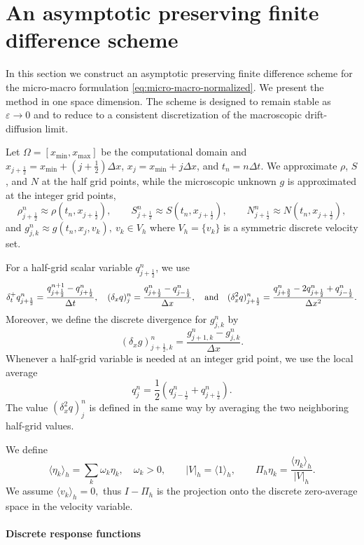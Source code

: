 \documentclass[11pt,twoside]{article}
\numberwithin{equation}{section}
\theoremstyle{plain}
\theoremstyle{nonumberplain}
\newif\ifrevisionred
\DeclareRobustCommand{\st}[1]{{\ifrevisionred\color{red}\fi #1}}
\begin{document}
{
\section{An asymptotic preserving finite difference scheme}
\label{sec:scheme}

In this section we construct an asymptotic preserving finite difference
scheme for the micro-macro formulation \eqref{eq:micro-macro-normalized}. We present the method in one space dimension. The scheme is
designed to remain stable as \(\varepsilon\to0\) and to reduce to a
consistent discretization of the macroscopic drift-diffusion limit.

Let $\Omega = [x_{\min}, x_{\max}]$ be the computational domain and \(x_{j+\frac12}=x_{\min}+(j+\frac12)\Delta x\),
\(x_j=x_{\min}+j\Delta x\), and \(t_n=n\Delta t\). We approximate
\(\rho\), \(S\), and \(N\) at the half grid points, while the microscopic
unknown \(g\) is approximated at the integer grid points,
\[
\rho_{j+\frac12}^n\approx \rho(t_n,x_{j+\frac12}),\qquad
S_{j+\frac12}^n\approx S(t_n,x_{j+\frac12}),\qquad
N_{j+\frac12}^n\approx N(t_n,x_{j+\frac12}),
\]
and $
g_{j,k}^n\approx g(t_n,x_j,v_k),\ v_k\in V_h $ where \(V_h=\{v_k\}\) is a symmetric discrete velocity set.

For a half-grid scalar variable \(q_{j+\frac12}^n\), we use
\[
\delta_t^+ q_{j+\frac12}^n
=
\frac{q_{j+\frac12}^{n+1}-q_{j+\frac12}^n}{\Delta t},
\ \ \
(\delta_x q)_j^n
=
\frac{q_{j+\frac12}^n-q_{j-\frac12}^n}{\Delta x},\ \ \ \textnormal{and}\ \ \
(\delta_x^2 q)_{j+\frac12}^n
=
\frac{
q_{j+\frac32}^n
-2q_{j+\frac12}^n
+q_{j-\frac12}^n
}{\Delta x^2}.
\]
Moreover, we define the discrete divergence for \(g_{j,k}^n\) by
\[
(\delta_x g)_{j+\frac12,k}^n
=
\frac{g_{j+1,k}^n-g_{j,k}^n}{\Delta x}.
\]
Whenever a half-grid variable is needed at an integer grid point, we use
the local average
\[
q_j^n=\frac12\left(q_{j-\frac12}^n+q_{j+\frac12}^n\right).
\]
The value \((\delta_x^2 q)_j^n\) is defined in the same way by averaging
the two neighboring half-grid values.

 We define
\[
\st{\langle \eta_k\rangle_h=\sum_k\omega_k\eta_k,\quad \omega_k>0,}
\qquad
|V|_h=\langle 1\rangle_h,
\qquad
\Pi_h\eta_k=\frac{\langle \eta_k\rangle_h}{|V|_h}.
\]
We assume
$\langle v_k\rangle_h=0,$
thus \(I-\Pi_h\) is the projection onto the discrete zero-average space in
the velocity variable.

\paragraph{Discrete response functions}

}
\end{document}
